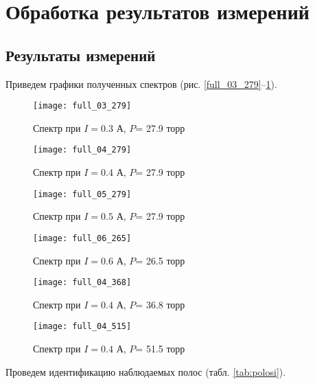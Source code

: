 \newpage
\section{Обработка результатов измерений}
\subsection{Результаты измерений}
Приведем графики полученных спектров (рис. \ref{full_03_279}--\ref{full_04_515}).
\begin{figure}[H]
	\begin{minipage}{0.45\linewidth}
		\centering
		\texttt{[image: full\_03\_279]}
		\caption{Спектр при $I= 0.3$ А, $P$= 27.9 торр}
		\label{full_03_279}
	\end{minipage} 
	\hfill
	\begin{minipage}[H]{0.45\linewidth}
		\centering
		\texttt{[image: full\_04\_279]}
		\caption{Спектр при $I= 0.4 $ А, $P$= 27.9 торр}
		\label{full_04_279}
	\end{minipage}
	\begin{minipage}{0.45\linewidth}
		\centering
		\texttt{[image: full\_05\_279]}
		\caption{Спектр при $I= 0.5 $ А, $P$= 27.9 торр}
		\label{full_05_279}	
	\end{minipage} 
	\hfill
	\begin{minipage}[H]{0.45\linewidth}
		\centering
		\texttt{[image: full\_06\_265]}
		\caption{Спектр при $I= 0.6 $ А, $P$= 26.5 торр}
		\label{full_06_265}
	\end{minipage}
	\begin{minipage}{0.45\linewidth}
		\centering
		\texttt{[image: full\_04\_368]}
		\caption{Спектр при $I= 0.4 $ А, $P$= 36.8 торр}	
		\label{full_04_368}
	\end{minipage} 
	\hfill
	\begin{minipage}[H]{0.45\linewidth}
		\centering
		\texttt{[image: full\_04\_515]}
		\caption{Спектр при $I= 0.4 $ А, $P$= 51.5 торр}
		\label{full_04_515}
	\end{minipage}
\end{figure}

Проведем идентификацию наблюдаемых полос (табл. \ref{tab:polosi}).

